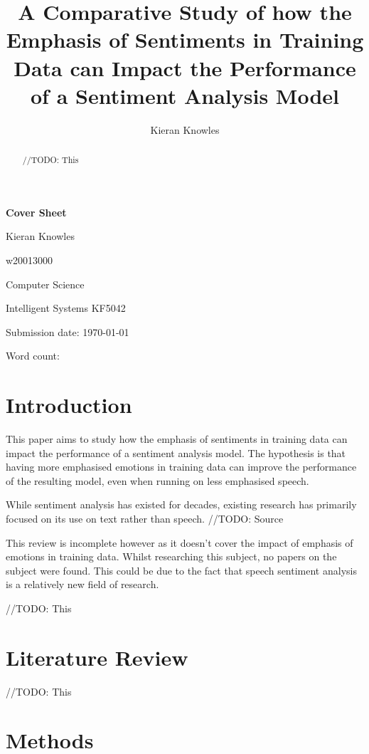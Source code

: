 \documentclass[journal]{IEEEtran}
\newcommand\wordcount{
    
}
\begin{document}
{\Large \textbf{Cover Sheet}}

Kieran Knowles

w20013000

Computer Science

Intelligent Systems KF5042

Submission date: \today

Word count: \wordcount

\title{A Comparative Study of how the Emphasis of Sentiments in Training Data can Impact the Performance of a Sentiment Analysis Model}
\author{Kieran Knowles}
\maketitle


\begin{abstract}
    //TODO: This

\end{abstract}

\section{Introduction}
This paper aims to study how the emphasis of sentiments in training data can impact the performance of a sentiment analysis
model. The hypothesis is that having more emphasised emotions in training data can improve the performance of the resulting
model, even when running on less emphasised speech.

While sentiment analysis has existed for decades, existing research has primarily focused on
its use on text rather than speech. //TODO: Source

This review is incomplete however as it doesn't cover the impact of emphasis of emotions in training data.
Whilst researching this subject, no papers on the subject were found.
This could be due to the fact that speech sentiment analysis is a relatively new field of research. \cite{maghilnan_sentiment_2017}

//TODO: This

\section{Literature Review}

//TODO: This

\section{Methods}
\end{document}
